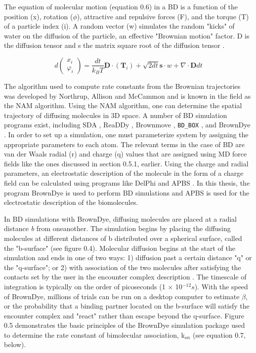 \documentclass[12pt]{ucsddissertation}
\begin{document}
\begin{dissertationintroduction}
The equation of molecular motion (equation 0.6) in a BD is a function of the position (x), rotation ($\phi$), attractive and repulsive forces (F), and the torque (T) of a particle index (i). A random vector (w) simulates the random "kicks" of water on the diffusion of the particle, an effective "Brownian motion" factor. D is the diffusion tensor and s the matrix square root of the diffusion tensor \cite{Huber2010}. 

\begin{equation}
    d \left( \begin{array} { c } { x _ { i } } \\ { \varphi _ { i } } \end{array} \right) = \frac { d t } { k _ { B } T } \mathbf { D } \cdot \left( \mathbf { T } _ { i } \right) + \sqrt { 2 d t } \mathbf { s } \cdot w + \nabla \cdot \mathbf { D } d t
\end{equation}

The algorithm used to compute rate constants from the Brownian trajectories was developed by Northrup, Allison and McCammon \cite{Northrup1984} and is known in the field as the NAM algorithm. Using the NAM algorithm, one can determine the spatial trajectory of diffusing molecules in 3D space. A number of BD simulation programs exist, including SDA \cite{Gabdoulline1997,Gabdoulline1998}, ReaDDy \cite{Schoneberg2013}, Brownmove \cite{Geyer2011}, \texttt{BD\_BOX} \cite{Dugosz2011}, and BrownDye \cite{Huber2010}. In order to set up a simulation, one must parameterize system by assigning the appropriate parameters to each atom. The relevant terms in the case of BD are van der Waals radial (r) and charge (q) values that are assigned using MD force fields like the ones discussed in  section 0.5.1, earlier. Using the charge and radial parameters, an electrostatic description of the molecule in the form of a charge field can be calculated using programs like DelPhi \cite{Honig1995} and APBS \cite{Baker2001}. In this thesis, the program BrownDye is used to perform BD simulations and APBS is used for the electrostatic description of the biomolecules. 

In BD simulations with BrownDye, diffusing molecules are placed at a radial distance \textit{b} from oneanother. The simulation begins by placing the diffusing molecules at different distances of b distributed over a spherical surface, called the "b-surface" (see figure 0.4). Molecular diffusion begins at the start of the simulation and ends in one of two ways: 1) diffusion past a certain distance "q" or the "q-surface"; or 2) with association of the two molecules after satisfying the contacts set by the user in the encounter complex description \cite{Huber2010}. The timescale of integration is typically on the order of picoseconds (1 $\times$ 10$^{-12}s$). With the speed of BrownDye, millions of trials can be run on a desktop computer to estimate $\beta$, or the probability that a binding partner located on the b-surface will satisfy the encounter complex and "react" rather than escape beyond the q-surface. Figure 0.5 demonstrates the basic principles of the BrownDye simulation package used to determine the rate constant of bimolecular association, k$_{on}$ (see equation 0.7, below).


\end{dissertationintroduction}
\end{document}
